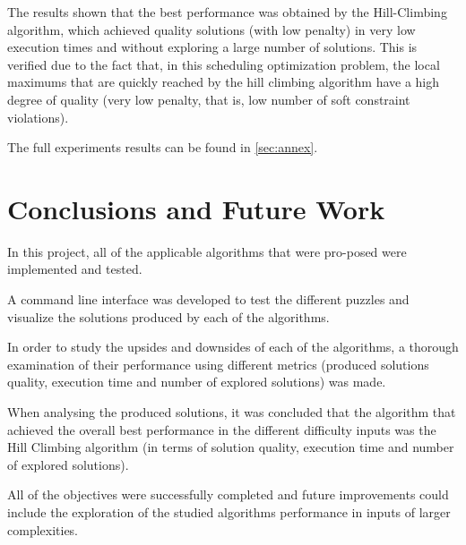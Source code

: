 \documentclass[conference]{IEEEtran}
\begin{document}
The results shown that the best performance was obtained by the Hill-Climbing algorithm, which achieved quality solutions (with low penalty) in very low execution times and without exploring a large number of solutions. This is verified due to the fact that, in this scheduling optimization problem, the local maximums that are quickly reached by the hill climbing algorithm have a high degree of quality (very low penalty, that is, low number of soft constraint violations). 

The full experiments results can be found in \autoref{sec:annex}.

\section{Conclusions and Future Work}

In this project, all of the applicable algorithms that were pro-posed were implemented and tested.

A command line interface was developed to test the different puzzles and visualize the solutions produced by each of the algorithms.

In order to study the upsides and downsides of each of the algorithms, a thorough examination of their performance using different metrics (produced solutions quality, execution time and number of explored solutions) was made. 

When analysing the produced solutions, it was concluded that the algorithm that achieved the overall best performance in the different difficulty inputs was the Hill Climbing algorithm (in terms of solution quality, execution time and number of explored solutions). 

All  of  the  objectives  were  successfully  completed  and future improvements could include the exploration of the studied algorithms performance in inputs of larger complexities.

\begin{thebibliography}{00}
    



\end{thebibliography}
\end{document}
